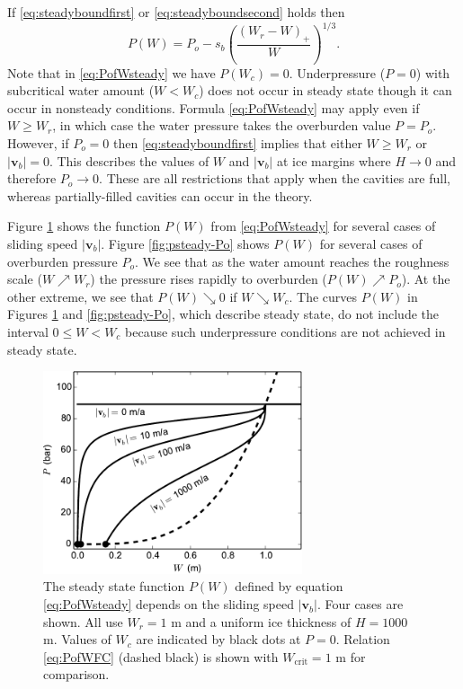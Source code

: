\documentclass[gmd]{copernicus}   %
\newcommand{\text}{\textrm}
\newcommand\bv{\mathbf{v}}
\begin{document}
If \eqref{eq:steadyboundfirst} or \eqref{eq:steadyboundsecond} holds then
\begin{equation}
P(W) = P_o - s_b \left(\frac{(W_r - W)_+}{W}\right)^{1/3}.  \label{eq:PofWsteady}
\end{equation}
Note that in \eqref{eq:PofWsteady} we have $P(W_c)=0$.  Underpressure ($P=0$) with subcritical water amount ($W<W_c$) does not occur in steady state though it can occur in nonsteady conditions.  Formula \eqref{eq:PofWsteady} may apply even if $W\ge W_r$, in which case the water pressure takes the overburden value $P = P_o$.  However, if $P_o=0$ then \eqref{eq:steadyboundfirst} implies that either $W\ge W_r$ or $|\bv_b|=0$.  This describes the values of $W$ and $|\bv_b|$ at ice margins where $H\to 0$ and therefore $P_o\to 0$.  These are all restrictions that apply when the cavities are full, whereas partially-filled cavities can occur in the \cite{Schoofetal2012} theory.

\newcommand{\upto}{ \!\!\nearrow\! }
\newcommand{\downto}{ \!\searrow\! }
Figure \ref{fig:psteady-vb} shows the function $P(W)$ from \eqref{eq:PofWsteady} for several cases of sliding speed $|\bv_b|$.  Figure \ref{fig:psteady-Po} shows $P(W)$ for several cases of overburden pressure $P_o$.  We see that as the water amount reaches the roughness scale ($W\upto W_r$) the pressure rises rapidly to overburden ($P(W) \upto P_o$).  At the other extreme, we see that $P(W) \downto 0$ if $W \downto W_c$.  The curves $P(W)$ in Figures \ref{fig:psteady-vb} and \ref{fig:psteady-Po}, which describe steady state, do not include the interval $0\le W < W_c$ because such underpressure conditions are not achieved in steady state.

\begin{figure}[ht]
\includegraphics[width=3.0in,keepaspectratio=true]{psteady-vb}
\caption{The steady state function $P(W)$ defined by equation \eqref{eq:PofWsteady} depends on the sliding speed $|\bv_b|$.  Four cases are shown.  All use $W_r=1$ m and a uniform ice thickness of $H=1000$ m.  Values of $W_c$ are indicated by black dots at $P=0$.  Relation \eqref{eq:PofWFC} (dashed black) is shown with $W_{\text{crit}}=1$ m for comparison.}
\label{fig:psteady-vb}
\end{figure}
\end{document}
